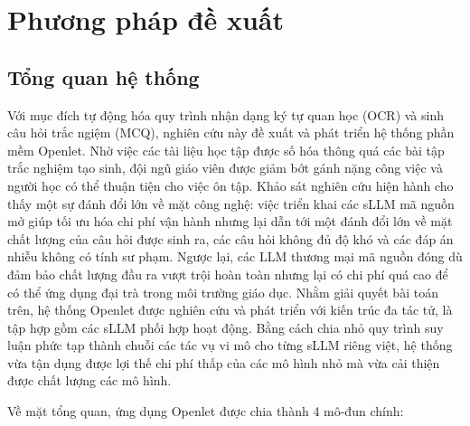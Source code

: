 \chapter{Phương pháp đề xuất}

\section{Tổng quan hệ thống}

Với mục đích tự động hóa quy trình nhận dạng ký tự quan học (OCR) và sinh câu hỏi trắc ngiệm (MCQ), nghiên cứu này đề xuất và phát triển hệ thống phần mềm Openlet. Nhờ việc các tài liệu học tập được số hóa thông quá các bài tập trắc nghiệm tạo sinh, đội ngũ giáo viên được giảm bớt gánh nặng công việc và người học có thể thuận tiện cho việc ôn tập. Khảo sát nghiên cứu hiện hành cho thấy một sự đánh đổi lớn về mặt công nghệ: việc triển khai các sLLM mã nguồn mở giúp tối ưu hóa chi phí vận hành nhưng lại dẫn tới một đánh đổi lớn về mặt chất lượng của câu hỏi được sinh ra, các câu hỏi không đủ độ khó và các đáp án nhiễu không có tính sư phạm. Ngược lại, các LLM thương mại mã nguồn đóng dù đảm bảo chất lượng đầu ra vượt trội hoàn toàn nhưng lại có chi phí quá cao để có thể ứng dụng đại trà trong môi trường giáo dục. Nhằm giải quyết bài toán trên, hệ thống Openlet được nghiên cứu và phát triển với kiến trúc đa tác tử, là tập hợp gồm các sLLM phối hợp hoạt động. Bằng cách chia nhỏ quy trình suy luận phức tạp thành chuỗi các tác vụ vi mô cho từng sLLM riêng việt, hệ thống vừa tận dụng được lợi thế chi phí thấp của các mô hình nhỏ mà vừa cải thiện được chất lượng các mô hình.

Về mặt tổng quan, ứng dụng Openlet được chia thành 4 mô-đun chính:

